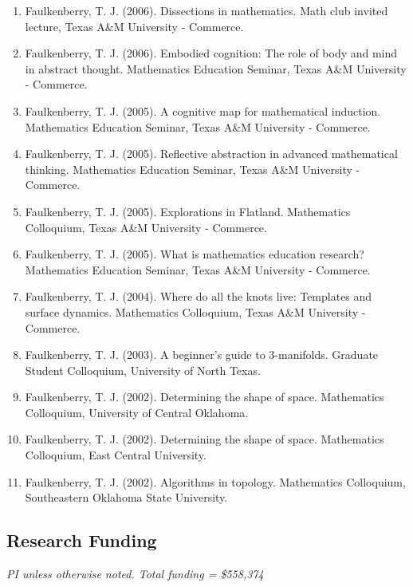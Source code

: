 \documentclass[article,10pt]{article}
\begin{document}
\begin{enumerate}
\item Faulkenberry, T. J. (2006). Dissections in mathematics. Math club invited lecture, Texas A\&M University - Commerce.
\item Faulkenberry, T. J. (2006). Embodied cognition: The role of body and mind in abstract thought. Mathematics Education Seminar, Texas A\&M University - Commerce.
\item Faulkenberry, T. J. (2005). A cognitive map for mathematical induction. Mathematics Education Seminar, Texas A\&M University - Commerce.
\item Faulkenberry, T. J. (2005). Reflective abstraction in advanced mathematical thinking. Mathematics Education Seminar, Texas A\&M University - Commerce.
\item Faulkenberry, T. J. (2005). Explorations in Flatland. Mathematics Colloquium, Texas A\&M University - Commerce.
\item Faulkenberry, T. J. (2005). What is mathematics education research? Mathematics Education Seminar, Texas A\&M University - Commerce.
\item Faulkenberry, T. J. (2004). Where do all the knots live: Templates and surface dynamics. Mathematics Colloquium, Texas A\&M University - Commerce.
\item Faulkenberry, T. J. (2003). A beginner’s guide to 3-manifolds. Graduate Student Colloquium, University of North Texas.
\item Faulkenberry, T. J. (2002). Determining the shape of space. Mathematics Colloquium, University of Central Oklahoma.
\item Faulkenberry, T. J. (2002). Determining the shape of space. Mathematics Colloquium, East Central University.
\item Faulkenberry, T. J. (2002). Algorithms in topology. Mathematics Colloquium, Southeastern Oklahoma State University.
\end{enumerate}

\subsection*{Research Funding}
\label{sec:org3fa3bda}

\emph{PI unless otherwise noted.  Total funding = \$558,374}
\end{document}
